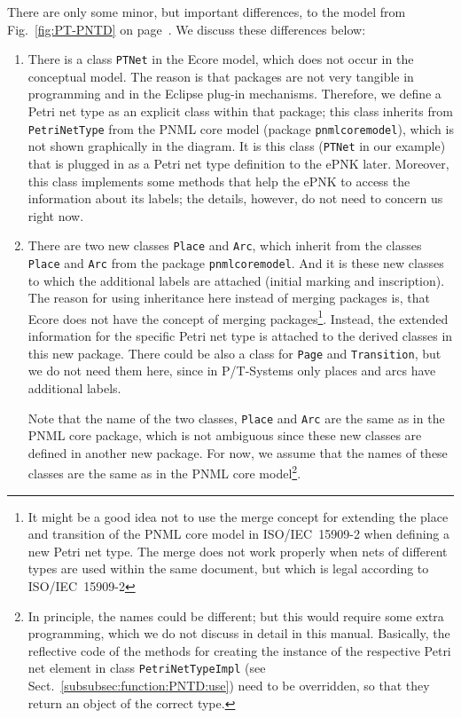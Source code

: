There are only some minor, but important differences, to the model from
Fig.~\ref{fig:PT-PNTD} on page~\pageref{fig:PT-PNTD}. We discuss these
differences below: 
\begin{enumerate}
  \item There is a class {\tt PTNet} in the Ecore model, which does not occur
        in the conceptual model. The reason is that packages are not very
        tangible in programming and in the Eclipse plug-in mechanisms. Therefore,
        we define a Petri net type as an explicit class within that package;
        this class inherits from {\tt PetriNetType}%
        from the PNML core model
        (package {\tt pnmlcoremodel}), which is not shown graphically in the diagram. It is
        this class ({\tt PTNet} in our example) that is plugged in as a Petri
        net type definition to the ePNK later. Moreover, this class
        implements some methods that help the ePNK to access the information
        about its labels; the details, however, do not need to concern us right now.
        
  \item There are two new classes {\tt Place} and {\tt Arc}, which
        inherit from the classes {\tt Place} and {\tt Arc} from the package 
        {\tt pnmlcoremodel}.  And it is these new classes to which the additional
        labels are attached (initial marking and inscription). The reason 
        for using inheritance here instead of merging packages is, that 
        Ecore does not have the concept of merging packages\footnote
          {It might be a good idea not to use the merge concept for
           extending the place and transition of the PNML core model in
           ISO/IEC~15909-2 when defining a new Petri net type. The
           merge does not work properly when nets of different types
           are used within the same document, but which is legal according
           to ISO/IEC~15909-2}.
        Instead, the extended information
        for the specific Petri net type is attached to the derived classes
        in this new package. There could be also a class for {\tt Page} and
        {\tt Transition}, but we do not need them here, since in P/T-Systems
        only places and arcs have additional labels. 
        
        Note that the name of the two classes, {\tt Place}  and {\tt Arc} are
        the same as in the PNML core package, which is not ambiguous since these
        new classes are defined in another new package.  For now, we assume that
        the names of these classes are the same as in the PNML core model\footnote 
          {In principle, the names could be different; but this would require
           some extra programming, which we do not discuss in detail in this
           manual. Basically, the reflective code of the methods for creating
           the instance of the respective Petri net element in class {\tt PetriNetTypeImpl}
           (see Sect.~\ref{subsubsec:function:PNTD:use}) need to be overridden,
           so that they return an object of the correct type.}.
        

\end{enumerate}
